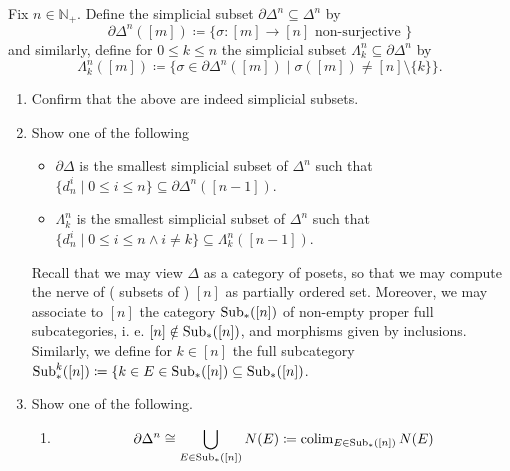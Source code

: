     \begin{Exercise}
        
    Fix $ n \in \mathbb{ N }_+ $.
    Define the simplicial subset $ \partial \Delta^n \subseteq \Delta^n $ by
    \[
        \partial \Delta^n ( [ m ] ) \coloneqq \{ \sigma \colon [ m ] \to [ n ] \text{ non-surjective } \}
    \]
    and similarly, define for $ 0 \leq k \leq n $ the simplicial subset $ \Lambda_k^n \subseteq \partial \Delta^n $ by
    \[
        \Lambda_k^n( [ m ] ) \coloneqq \{ \sigma  \in \partial \Delta^n ( [ m ] ) \mid \sigma ( [ m ] ) \neq [ n ] \setminus \{ k \} \}.
    \]
    \begin{enumerate}[label=(\alph*)]
        
        \item 
        Confirm that the above are indeed simplicial subsets.
    
        \item 
        Show one of the following 
        \begin{itemize}
        
            \item 
            $ \partial \Delta $ is the smallest simplicial subset of $ \Delta^n $ such that $ \{ d_n^i \mid 0 \leq i \leq n \} \subseteq \partial \Delta^n ( [ n - 1 ] ) $.
    
            \item 
            $\Lambda_k^n$ is the smallest simplicial subset of $ \Delta^n $ such that $ \{ d_n^i \mid 0 \leq i \leq n \wedge i \neq k \} \subseteq \Lambda^n_k ( [ n - 1 ] )$.
            
        \end{itemize}
    
    Recall that we may view $ \Delta $ as a category of posets, so that we may compute the nerve of ( subsets of ) $ [ n ] $ as partially ordered set.
    Moreover, we may associate to $ [ n ] $ the category $ \operatorname{Sub}_* ( [ n ] ) $ of non-empty proper full subcategories, i. e. $ [ n ] \notin \operatorname{Sub}_* ( [ n ] ) $, and morphisms given by inclusions.
    Similarly, we define for $ k \in [ n ] $ the full subcategory $ \operatorname{Sub}_*^k ( [ n ] ) \coloneqq \{ k \in E \in \operatorname{Sub}_* ( [ n ] ) \subseteq  \operatorname{Sub}_* ( [ n ] )$.
    
        \item 
        Show one of the following.
    
        \begin{enumerate}
            \item 
            \[
                \partial \Delta^n
                \cong 
                \bigcup_{ E \in \operatorname{Sub}_* ( [ n ] ) } N ( E ) \coloneqq 
                \operatorname{colim}_{ E \in \operatorname{Sub}_* ( [ n ] ) } N ( E ) 
            \]
    

\end{enumerate}
\end{enumerate}
\end{Exercise}
